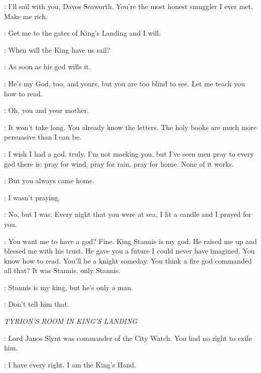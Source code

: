 
\SALLADHOR: I'll sail with you, Davos Seaworth. You're the most honest smuggler I ever met. Make me rich.

\DAVOS: Get me to the gates of King's Landing and I will.


\MATTHOS: When will the King have us sail?

\DAVOS: As soon as his god wills it.

\MATTHOS: He's my God, too, and yours, but you are too blind to see. Let me teach you how to read.

\DAVOS: Oh, you and your mother.

\MATTHOS: It won't take long. You already know the letters. The holy books are much more persuasive than I can be.

\DAVOS: I wish I had a god, truly. I'm not mocking you, but I've seen men pray to every god there is: pray for wind, pray for rain, pray for home. None of it works.

\MATTHOS: But you always came home.

\DAVOS: I wasn't praying.

\MATTHOS: No, but I was. Every night that you were at sea, I lit a candle and I prayed for you.

\DAVOS: You want me to have a god? Fine. King Stannis is my god. He raised me up and blessed me with his trust. He gave you a future I could never have imagined. You know how to read. You'll be a knight someday. You think a fire god commanded all that? It was Stannis, only Stannis.

\MATTHOS: Stannis is my king, but he's only a man.

\DAVOS: Don't tell him that.



\scene

\textit{TYRION'S ROOM IN KING'S LANDING}


\CERSEI: Lord Janos Slynt was commander of the City Watch. You had no right to exile him.

\TYRION: I have every right. I am the King's Hand.

